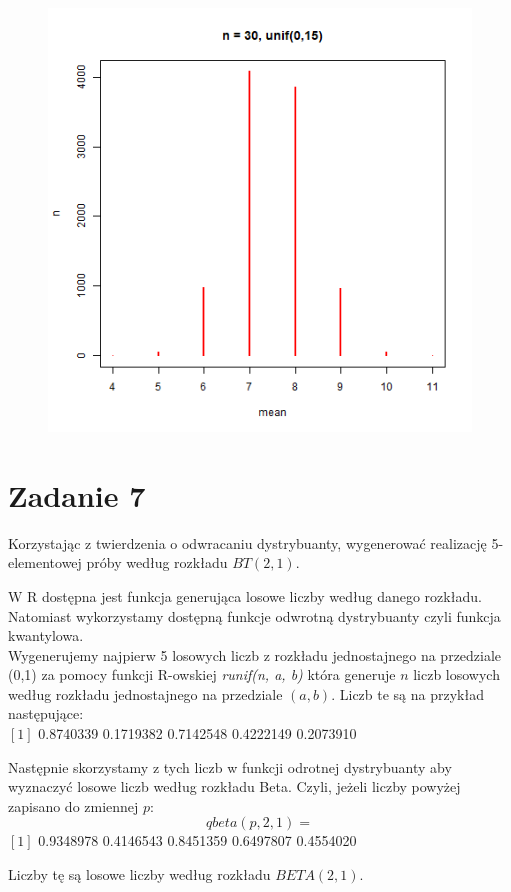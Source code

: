 \documentclass{article}
\begin{document}
\begin{figure}[h!]
\begin{center}
\includegraphics[height=0.4\textheight, angle=0]{"n30_1.png"}
\end{center}
\end{figure}


\newpage
\section*{Zadanie 7}
Korzystając z twierdzenia o odwracaniu dystrybuanty, wygenerować realizację 5-
elementowej próby według rozkładu $BT(2,1)$. \\ \par
W R dostępna jest funkcja generująca losowe liczby według danego rozkładu. Natomiast wykorzystamy dostępną funkcje odwrotną dystrybuanty czyli funkcja kwantylowa. \\
Wygenerujemy najpierw 5 losowych liczb z rozkładu jednostajnego na przedziale (0,1) za pomocy funkcji R-owskiej \textit{runif(n, a, b)} która generuje $n$ liczb losowych według rozkładu jednostajnego na przedziale $(a,b)$. Liczb te są na przykład następujące: \\
$[1]$ 0.8740339 0.1719382 0.7142548 0.4222149 0.2073910 \\ \par
Następnie skorzystamy z tych liczb w funkcji odrotnej dystrybuanty aby wyznaczyć losowe liczb według rozkładu Beta. Czyli, jeżeli liczby powyżej zapisano do zmiennej $p$:
$$qbeta(p, 2, 1) =$$
$[1]$ 0.9348978 0.4146543 0.8451359 0.6497807 0.4554020 \\ \par
Liczby tę są losowe liczby według rozkładu $BETA(2,1)$.
\end{document}

